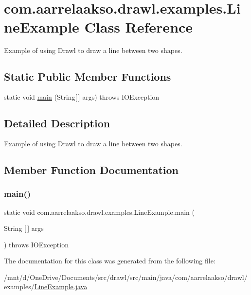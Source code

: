 \hypertarget{classcom_1_1aarrelaakso_1_1drawl_1_1examples_1_1_line_example}{}\section{com.\+aarrelaakso.\+drawl.\+examples.\+Line\+Example Class Reference}
\label{classcom_1_1aarrelaakso_1_1drawl_1_1examples_1_1_line_example}


Example of using Drawl to draw a line between two shapes.  


\subsection*{Static Public Member Functions}
\begin{DoxyCompactItemize}
\item 
static void \hyperlink{classcom_1_1aarrelaakso_1_1drawl_1_1examples_1_1_line_example_ad1d9edf57e4ba04895c95bf1e6e9ac70}{main} (String\mbox{[}$\,$\mbox{]} args)  throws I\+O\+Exception     
\end{DoxyCompactItemize}


\subsection{Detailed Description}
Example of using Drawl to draw a line between two shapes. 

\subsection{Member Function Documentation}
\mbox{\label{classcom_1_1aarrelaakso_1_1drawl_1_1examples_1_1_line_example_ad1d9edf57e4ba04895c95bf1e6e9ac70}} 
\subsubsection{\texorpdfstring{main()}{main()}}
{\footnotesize\ttfamily static void com.\+aarrelaakso.\+drawl.\+examples.\+Line\+Example.\+main (\begin{DoxyParamCaption}\item[{String \mbox{[}$\,$\mbox{]}}]{args }\end{DoxyParamCaption}) throws I\+O\+Exception\hspace{0.3cm}{\ttfamily [static]}}



The documentation for this class was generated from the following file\+:\begin{DoxyCompactItemize}
\item 
/mnt/d/\+One\+Drive/\+Documents/src/drawl/src/main/java/com/aarrelaakso/drawl/examples/\hyperlink{_line_example_8java}{Line\+Example.\+java}\end{DoxyCompactItemize}

